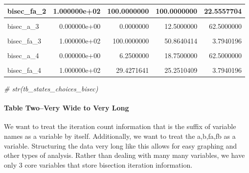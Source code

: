 \documentclass[
]{book}
\newenvironment{Shaded}{\begin{snugshade}}{\end{snugshade}}
\newcommand{\CommentTok}[1]{\textcolor[rgb]{0.56,0.35,0.01}{\textit{#1}}}
\begin{document}
\begin{table}[!h]
\begin{tabular}{l|r|r|r|r}
\hline
bisec\_fa\_2 & 1.000000e+02 & 100.0000000 & 100.0000000 & 22.5557704\\
\hline
\cellcolor{gray!6}{bisec\_fb\_2} & \cellcolor{gray!6}{-2.464562e+03} & \cellcolor{gray!6}{-224.1460032} & \cellcolor{gray!6}{-0.6857375} & \cellcolor{gray!6}{-14.8701831}\\
\hline
bisec\_a\_3 & 0.000000e+00 & 0.0000000 & 12.5000000 & 62.5000000\\
\hline
\cellcolor{gray!6}{bisec\_b\_3} & \cellcolor{gray!6}{1.250000e+01} & \cellcolor{gray!6}{12.5000000} & \cellcolor{gray!6}{25.0000000} & \cellcolor{gray!6}{75.0000000}\\
\hline
bisec\_fa\_3 & 1.000000e+02 & 100.0000000 & 50.8640414 & 3.7940196\\
\hline
\cellcolor{gray!6}{bisec\_fb\_3} & \cellcolor{gray!6}{-1.041574e+03} & \cellcolor{gray!6}{-51.1700464} & \cellcolor{gray!6}{-0.6857375} & \cellcolor{gray!6}{-14.8701831}\\
\hline
bisec\_a\_4 & 0.000000e+00 & 6.2500000 & 18.7500000 & 62.5000000\\
\hline
\cellcolor{gray!6}{bisec\_b\_4} & \cellcolor{gray!6}{6.250000e+00} & \cellcolor{gray!6}{12.5000000} & \cellcolor{gray!6}{25.0000000} & \cellcolor{gray!6}{68.7500000}\\
\hline
bisec\_fa\_4 & 1.000000e+02 & 29.4271641 & 25.2510409 & 3.7940196\\
\hline
\end{tabular}
\end{table}

\begin{Shaded}
\begin{Highlighting}[]
\CommentTok{\# str(tb\_states\_choices\_bisec)}
\end{Highlighting}
\end{Shaded}

\hypertarget{table-twovery-wide-to-very-long}{%
\paragraph{Table Two--Very Wide to Very Long}\label{table-twovery-wide-to-very-long}}

We want to treat the iteration count information that is the suffix of variable names as a variable by itself. Additionally, we want to treat the a,b,fa,fb as a variable. Structuring the data very long like this allows for easy graphing and other types of analysis. Rather than dealing with many many variables, we have only 3 core variables that store bisection iteration information.
\end{document}

